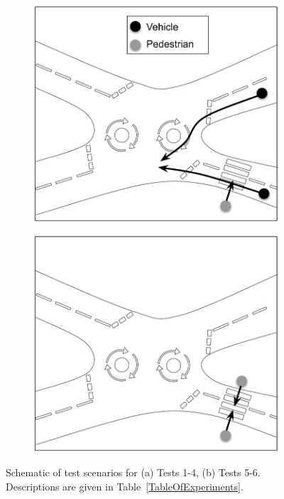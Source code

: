 \documentclass[letterpaper, 10 pt, journal, twoside]{IEEEtran}
\begin{document}
\begin{figure}[h]
    \centering
    \begin{subfigure}{.24\textwidth}
        \includegraphics[width=1\textwidth]{Other/Figures/TestCasesDiagram_a.pdf}
        \caption{}
        \label{Test_a}
    \end{subfigure}
    \begin{subfigure}{.24\textwidth}
        \includegraphics[width=1\textwidth]{Other/Figures/TestCasesDiagram_b.pdf}
        \caption{}
        \label{Test_b}
    \end{subfigure}
    \caption{Schematic of test scenarios for (a) Tests 1-4, (b) Tests 5-6. Descriptions are given in Table~\ref{TableOfExperiments}.}
\end{figure}
\end{document}
